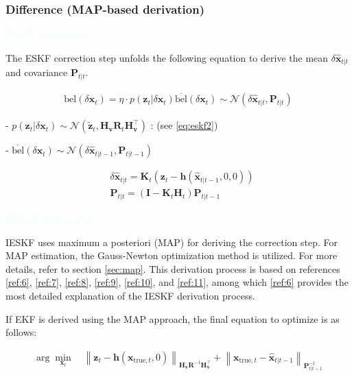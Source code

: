 \documentclass[10pt]{article}
\newcommand{\textbfazure}[1]{\textcolor{azure}{\textbf{#1}}}
\begin{document}
\subsubsection{Difference (MAP-based derivation)}
\textbfazure{ESKF derivation:}

The ESKF correction step unfolds the following equation to derive the mean $\delta \hat{\mathbf{x}}_{t|t}$ and covariance $\mathbf{P}_{t|t}$.

\begin{equation} \label{eq:ieskf1}
	\begin{aligned} 
		\text{bel}(\delta \mathbf{x}_{t}) = \eta \cdot p(\mathbf{z}_{t} | \delta  \mathbf{x}_{t}) \overline{\text{bel}}(\delta \mathbf{x}_{t}) \sim \mathcal{N}(\delta \hat{\mathbf{x}}_{t|t}, \mathbf{P}_{t|t})
	\end{aligned} 
\end{equation}

- $p(\mathbf{z}_{t} | \delta  \mathbf{x}_{t}) \sim \mathcal{N}(\tilde{\mathbf{z}}_{t}, \mathbf{H}_{\mathbf{v}}\mathbf{R}_{t}\mathbf{H}_{\mathbf{v}}^{\intercal})$ : (see \ref{eq:eskf2})

- $\overline{\text{bel}}(\delta \mathbf{x}_{t}) \sim \mathcal{N}(\delta \hat{\mathbf{x}}_{t|t-1}, \mathbf{P}_{t|t-1})$

\begin{equation} 
	\boxed{  \begin{aligned} 
			& \delta \hat{\mathbf{x}}_{t|t} = \mathbf{K}_{t} (\mathbf{z}_{t} - \mathbf{h}(\hat{\mathbf{x}}_{t|t-1}, 0,0)) \\
			& \mathbf{P}_{t|t} = (\mathbf{I} - \mathbf{K}_{t}\mathbf{H}_{t})\mathbf{P}_{t|t-1}
	\end{aligned} }
\end{equation}

\textbfazure{IESKF derivation:}

IESKF uses maximum a posteriori (MAP) for deriving the correction step. For MAP estimation, the Gauss-Newton optimization method is utilized. For more details, refer to section \ref{sec:map}. This derivation process is based on references \ref{ref:6}, \ref{ref:7}, \ref{ref:8}, \ref{ref:9}, \ref{ref:10}, and \ref{ref:11}, among which \ref{ref:6} provides the most detailed explanation of the IESKF derivation process.

If EKF is derived using the MAP approach, the final equation to optimize is as follows:

\begin{equation} \label{eq:ieskf2}
	\begin{aligned} 
		\arg\min_{\mathbf{x}_{t}} \quad \left\| \mathbf{z}_{t} - \mathbf{h}(\mathbf{x}_{\text{true}, t}, 0) \right\|_{\mathbf{H}_{\mathbf{v}}\mathbf{R}^{-1}\mathbf{H}_{\mathbf{v}}^{\intercal}} + \left\| \mathbf{x}_{\text{true},t} - \hat{\mathbf{x}}_{t|t-1} \right\|_{\mathbf{P}_{t|t-1}^{-1}} 
	\end{aligned} 
\end{equation}
\end{document}
